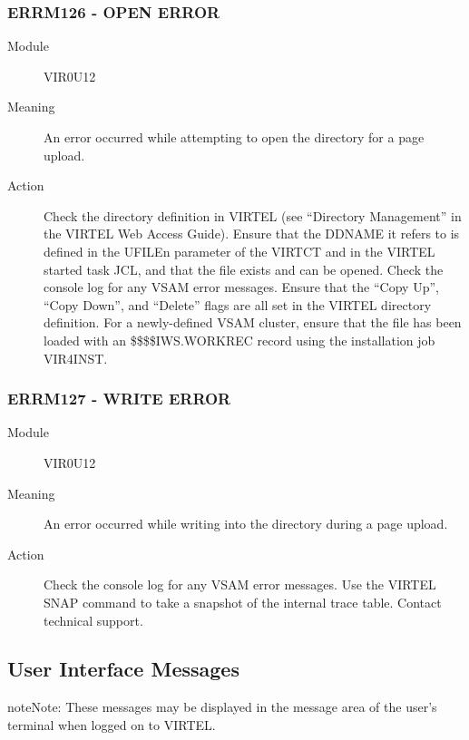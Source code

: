 \documentclass[letterpaper,10pt,english]{sphinxmanual}
\begin{document}
\subsubsection{ERRM126 - OPEN ERROR}
\label{\detokenize{messages:errm126-open-error}}\begin{description}
\item[{Module}] \leavevmode
VIR0U12

\item[{Meaning}] \leavevmode
An error occurred while attempting to open the directory for a page upload.

\item[{Action}] \leavevmode
Check the directory definition in VIRTEL (see “Directory Management” in the VIRTEL Web Access Guide). Ensure that the DDNAME it refers to is defined in the UFILEn parameter of the VIRTCT and in the VIRTEL started task JCL, and that the file exists and can be opened. Check the console log for any VSAM error messages. Ensure that the “Copy Up”, “Copy Down”, and “Delete” flags are all set in the VIRTEL directory definition. For a newly-defined VSAM cluster, ensure that the file has been loaded with an \$\$\$\$IWS.WORKREC record using the installation job VIR4INST.

\end{description}


\subsubsection{ERRM127 - WRITE ERROR}
\label{\detokenize{messages:errm127-write-error}}\begin{description}
\item[{Module}] \leavevmode
VIR0U12

\item[{Meaning}] \leavevmode
An error occurred while writing into the directory during a page upload.

\item[{Action}] \leavevmode
Check the console log for any VSAM error messages. Use the VIRTEL SNAP command to take a snapshot of the internal trace table. Contact technical support.

\end{description}


\subsection{User Interface Messages}
\label{\detokenize{messages:user-interface-messages}}
\begin{sphinxadmonition}{note}{Note:}
These messages may be displayed in the message area of the user’s terminal when logged on to VIRTEL.
\end{sphinxadmonition}
\end{document}
